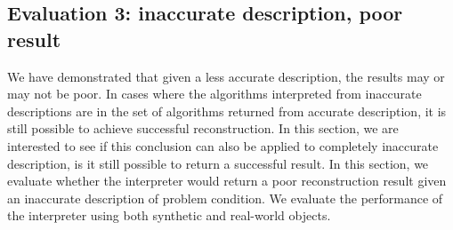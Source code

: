 

\subsection{Evaluation 3: inaccurate description, poor result}
We have demonstrated that given a less accurate description, the results may or may not be poor. In cases where the algorithms interpreted from inaccurate descriptions are in the set of algorithms returned from accurate description, it is still possible to achieve successful reconstruction. In this section, we are interested to see if this conclusion can also be applied to completely inaccurate description, \ie is it still possible to return a successful result. In this section, we evaluate whether the interpreter would return a poor reconstruction result given an inaccurate description of problem condition. We evaluate the performance of the interpreter using both synthetic and real-world objects.

